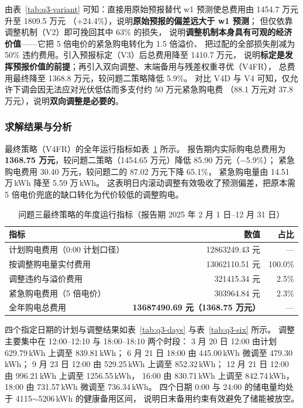 由表~\ref{tab:q3-variant} 可知：直接用原始预报替代 w1 预测使总费用由 1454.7 万元升至 1809.5 万元
（$+$24.4\%），说明\textbf{原始预报的偏差远大于 w1 预测}；
但仅依靠调整机制（V2）即可挽回其中 63\% 的损失，
说明\textbf{调整机制本身具有可观的经济价值}——它把 5 倍电价的紧急购电转化为 1.5 倍溢价、
把过配的全部损失削减为 50\% 违约费用。引入预报标定（V3）后总费用降至 1410.7 万元，
说明\textbf{标定是发挥预报价值的前提}；再引入双向调整、末端备用与残差权重寻优（V4FR），
总费用最终降至 1368.8 万元，较问题二策略降低 5.9\%。
对比 V4D 与 V4 可知，仅允许下调会因无法应对光伏低估而多支付约 50 万元紧急购电费
（88.1 万元对 37.8 万元），说明\textbf{双向调整是必要的}。

\subsubsection{求解结果与分析}
最终策略（V4FR）的全年运行指标如表~\ref{tab:q3-annual} 所示。
报告期内实际购电总费用为 \textbf{1368.75 万元}，较问题二策略（1454.65 万元）降低 85.90 万元（$-$5.9\%）；
紧急购电费用 30.40 万元，较问题二的 87.02 万元下降 65.1\%，
紧急购电量由 14.51 万\,kWh 降至 5.59 万\,kWh。
这表明日内滚动调整有效吸收了预测偏差，把原本需 5 倍电价兜底的缺口转化为代价较低的调整购电。

\begin{table}[!htbp]
\caption{问题三最终策略的年度运行指标（报告期 2025 年 2 月 1 日--12 月 31 日）}\label{tab:q3-annual}
\centering
\small
\setlength{\tabcolsep}{5pt}
\begin{tabular}{lrr}
\toprule
指标 & 数值 & 占比 \\
\midrule
计划购电费用（0:00 计划口径） & 12863249.43 元 & --- \\
按调整购电量实付费用 & 13062110.51 元 & 100.0\% \\
调整违约与溢价费用 & 321415.34 元 & 2.5\% \\
紧急购电费用（5 倍电价） & 303964.84 元 & 2.3\% \\
\midrule
全年购电总费用 & \textbf{13687490.69 元（1368.75 万元）} & --- \\
\bottomrule
\end{tabular}
\end{table}

四个指定日期的计划与调整结果如表~\ref{tab:q3-days} 与表~\ref{tab:q3-six} 所示。
调整主要集中在 12:00--12:10 与 18:00--18:10 两个时段：
3 月 20 日 12:00 由计划 629.79\,kWh 上调至 839.81\,kWh；
6 月 21 日 18:00 由 445.00\,kWh 微调至 479.30\,kWh；
9 月 23 日 12:00 由 529.25\,kWh 上调至 852.32\,kWh；
12 月 21 日 12:00 由 996.21\,kWh 上调至 1256.55\,kWh，
16:00 由 830.71\,kWh 上调至 842.74\,kWh，18:00 由 731.57\,kWh 微调至 736.34\,kWh。
四个日期 0:00 与 24:00 的储电量均处于 4115$\sim$5206\,kWh 的健康备用区间，
说明日末备用约束有效避免了储能被放空。

